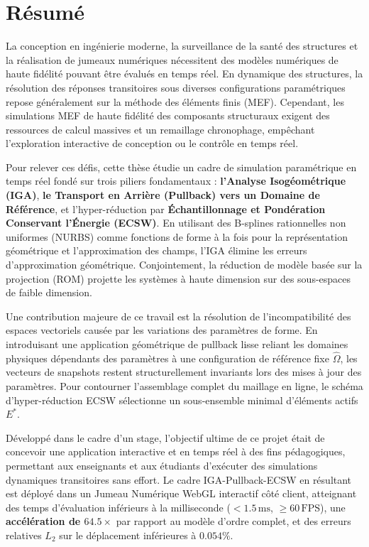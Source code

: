\vspace{1.5cm}

\chapter*{Résumé}

La conception en ingénierie moderne, la surveillance de la santé des structures et la réalisation de jumeaux numériques nécessitent des modèles numériques de haute fidélité pouvant être évalués en temps réel. En dynamique des structures, la résolution des réponses transitoires sous diverses configurations paramétriques repose généralement sur la méthode des éléments finis (MEF). Cependant, les simulations MEF de haute fidélité des composants structuraux exigent des ressources de calcul massives et un remaillage chronophage, empêchant l'exploration interactive de conception ou le contrôle en temps réel.

Pour relever ces défis, cette thèse étudie un cadre de simulation paramétrique en temps réel fondé sur trois piliers fondamentaux : \textbf{l'Analyse Isogéométrique (IGA)}, \textbf{le Transport en Arrière (Pullback) vers un Domaine de Référence}, et l'hyper-réduction par \textbf{Échantillonnage et Pondération Conservant l'Énergie (ECSW)}. En utilisant des B-splines rationnelles non uniformes (NURBS) comme fonctions de forme à la fois pour la représentation géométrique et l'approximation des champs, l'IGA élimine les erreurs d'approximation géométrique. Conjointement, la réduction de modèle basée sur la projection (ROM) projette les systèmes à haute dimension sur des sous-espaces de faible dimension.

Une contribution majeure de ce travail est la résolution de l'incompatibilité des espaces vectoriels causée par les variations des paramètres de forme. En introduisant une application géométrique de pullback lisse reliant les domaines physiques dépendants des paramètres à une configuration de référence fixe $\hat{\Omega}$, les vecteurs de snapshots restent structurellement invariants lors des mises à jour des paramètres. Pour contourner l'assemblage complet du maillage en ligne, le schéma d'hyper-réduction ECSW sélectionne un sous-ensemble minimal d'éléments actifs $E^*$. 

Développé dans le cadre d'un stage, l'objectif ultime de ce projet était de concevoir une application interactive et en temps réel à des fins pédagogiques, permettant aux enseignants et aux étudiants d'exécuter des simulations dynamiques transitoires sans effort. Le cadre IGA-Pullback-ECSW en résultant est déployé dans un Jumeau Numérique WebGL interactif côté client, atteignant des temps d'évaluation inférieurs à la milliseconde ($<1.5\,\text{ms}$, $\ge 60\,\text{FPS}$), une \textbf{accélération de $\mathbf{64.5\times}$} par rapport au modèle d'ordre complet, et des erreurs relatives $L_2$ sur le déplacement inférieures à $0.054\%$.
